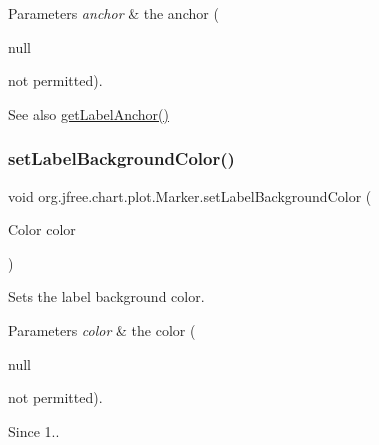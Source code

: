 \begin{DoxyParams}{Parameters}
{\em anchor} & the anchor (
\begin{DoxyCode}
null 
\end{DoxyCode}
 not permitted).\\
\hline
\end{DoxyParams}
\begin{DoxySeeAlso}{See also}
\mbox{\hyperlink{classorg_1_1jfree_1_1chart_1_1plot_1_1_marker_a597f1b7b60843de8f4b75ec8fc28f086}{get\+Label\+Anchor()}} 
\end{DoxySeeAlso}
\mbox{\label{classorg_1_1jfree_1_1chart_1_1plot_1_1_marker_a31d6677e1d6ae48196891fe2b8b2a2db}} 
\subsubsection{\texorpdfstring{set\+Label\+Background\+Color()}{setLabelBackgroundColor()}}
{\footnotesize\ttfamily void org.\+jfree.\+chart.\+plot.\+Marker.\+set\+Label\+Background\+Color (\begin{DoxyParamCaption}\item[{Color}]{color }\end{DoxyParamCaption})}

Sets the label background color.


\begin{DoxyParams}{Parameters}
{\em color} & the color (
\begin{DoxyCode}
null 
\end{DoxyCode}
 not permitted).\\
\hline
\end{DoxyParams}
\begin{DoxySince}{Since}
1.. 
\end{DoxySince}
\mbox{\label{classorg_1_1jfree_1_1chart_1_1plot_1_1_marker_af5f77944a9b858bd7dc2da90287df3c6}} 
